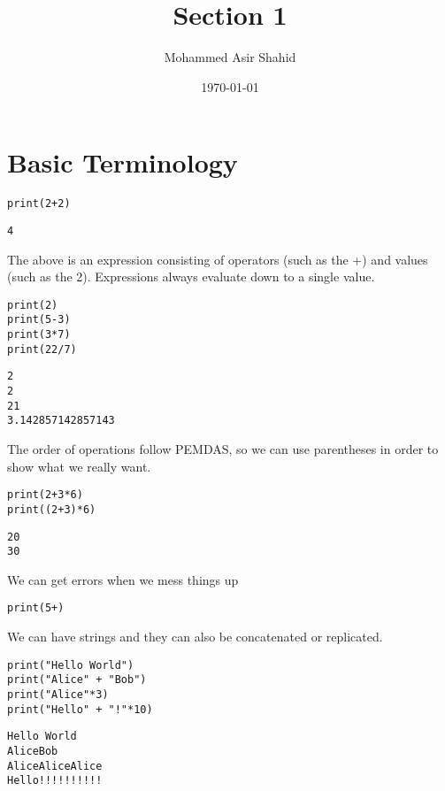 \documentclass[11pt]{article}
\author{Mohammed Asir Shahid}
\date{\today}
\title{Section 1}
\begin{document}
\maketitle
\tableofcontents


\section{Basic Terminology}
\label{sec:orgfbbe51e}


\begin{verbatim}
print(2+2)
\end{verbatim}

\begin{verbatim}
4
\end{verbatim}


The above is an expression consisting of operators (such as the +) and values (such as the 2). Expressions always evaluate down to a single value.

\begin{verbatim}
print(2)
print(5-3)
print(3*7)
print(22/7)
\end{verbatim}

\begin{verbatim}
2
2
21
3.142857142857143
\end{verbatim}


The order of operations follow PEMDAS, so we can use parentheses in order to show what we really want.


\begin{verbatim}
print(2+3*6)
print((2+3)*6)
\end{verbatim}

\begin{verbatim}
20
30
\end{verbatim}


We can get errors when we mess things up

\begin{verbatim}
print(5+)
\end{verbatim}

We can have strings and they can also be concatenated or replicated.

\begin{verbatim}
print("Hello World")
print("Alice" + "Bob")
print("Alice"*3)
print("Hello" + "!"*10)
\end{verbatim}

\begin{verbatim}
Hello World
AliceBob
AliceAliceAlice
Hello!!!!!!!!!!
\end{verbatim}
\end{document}
